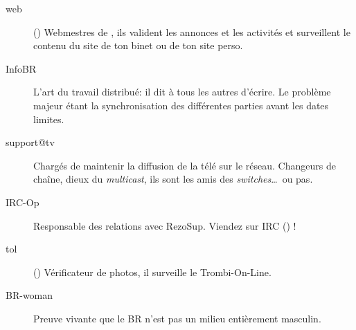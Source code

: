 \begin{description}
  \item[web] {() Webmestres de \fkz, ils valident les annonces et les activit\'es et surveillent le contenu du site de ton binet ou de ton site perso.}


  \item[InfoBR]{L'art du travail distribu\'e: il dit \`a tous les autres d'\'ecrire. Le probl\`eme majeur \'etant la synchronisation des diff\'erentes parties avant les dates limites.}

  \item[support@tv]{Charg\'es de maintenir la diffusion de la t\'el\'e sur le r\'eseau. Changeurs de cha\^ine, dieux du \emph{multicast}, ils sont les amis des \emph{switches}\dots\ ou pas.}


  \item[IRC-Op]{Responsable des relations avec RezoSup. Viendez sur IRC () !}

  \item[tol] {() V\'erificateur de photos, il surveille le Trombi-On-Line.}

  \item[BR-woman]{Preuve vivante que le BR n'est pas un milieu enti\`erement masculin.}

\end{description}

